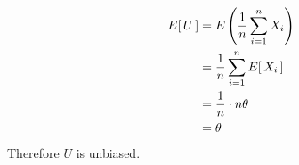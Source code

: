 \begin{align*}
    E[ \,{U}\, ] &= E \left( {\frac{1}{{n}}\sum_{i=1}^n X_i} \right)\\
    &= \frac{1}{{n}} \sum_{i=1}^n E[ \,{X_i}\, ]\\
    &= \frac{1}{{n}} \cdot n \theta\\
    &= \theta
\end{align*}
Therefore $U$ is unbiased.